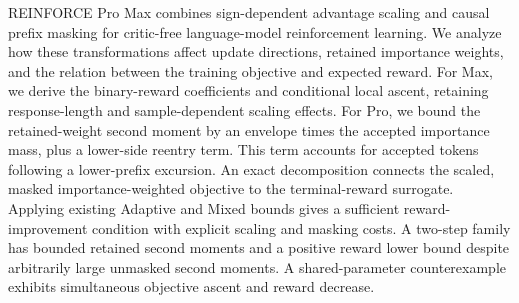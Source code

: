 REINFORCE Pro Max combines sign-dependent advantage scaling and causal
prefix masking for critic-free language-model reinforcement learning.
We analyze how these transformations affect update directions, retained
importance weights, and the relation between the training objective and
expected reward. For Max, we derive the binary-reward coefficients and
conditional local ascent, retaining response-length and sample-dependent
scaling effects. For Pro, we bound the retained-weight second moment by
an envelope times the accepted importance mass, plus a lower-side reentry
term. This term accounts for accepted tokens following a lower-prefix excursion. An exact decomposition connects the scaled,
masked importance-weighted objective to the terminal-reward surrogate. Applying existing
Adaptive and Mixed bounds gives a sufficient reward-improvement condition
with explicit scaling and masking costs. A two-step family has bounded retained second moments and a positive
reward lower bound despite arbitrarily large unmasked second moments.
A shared-parameter counterexample exhibits simultaneous objective ascent
and reward decrease.
